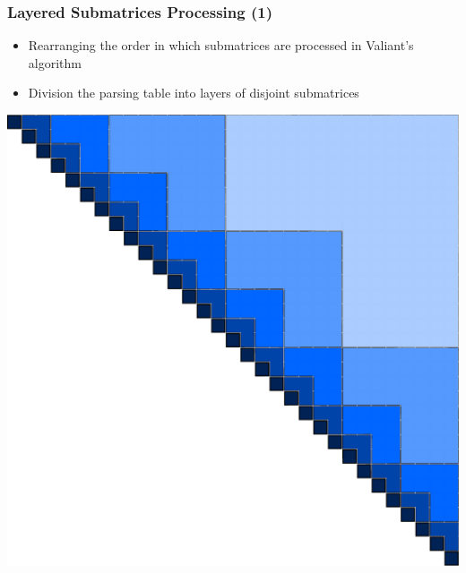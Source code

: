\documentclass[xcolor=table]{beamer}
\begin{document}
\begin{frame}[fragile] \frametitle{Layered Submatrices Processing (1)}

    \vspace{55pt}
    \begin{itemize}
    \item Rearranging the order in which \linebreak submatrices are processed in \linebreak Valiant's algorithm
    \item Division the parsing table into \linebreak layers of disjoint submatrices
    \end{itemize}
        
    \vspace{-130pt}\hspace{165pt}\includegraphics[width = 0.5\linewidth]{pic/layers.pdf}

    
\end{frame}
\end{document}
